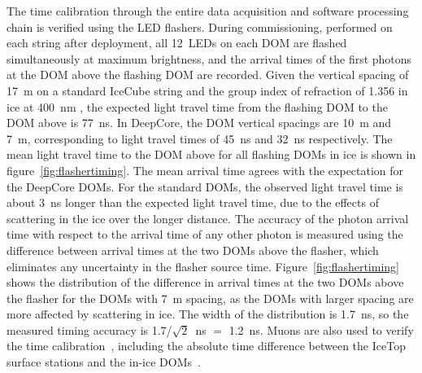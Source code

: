 The time calibration through the entire data acquisition and software
processing chain is verified using the LED flashers. During
commissioning, performed on each string after deployment, all 12~LEDs on
each DOM are flashed simultaneously at 
maximum brightness, and the arrival times of the first photons at the DOM above the flashing DOM
are recorded. Given the vertical spacing of 17~m on a standard IceCube
string and the group index of
refraction of  1.356 in ice at 400~nm \cite{price_woschnagg_ice}, the expected light travel time
from the flashing DOM to the DOM above is 77~ns. In DeepCore, the DOM
vertical spacings are 10~m and 7~m, corresponding to light travel
times of 45~ns and 32~ns respectively. The mean light travel
time to the DOM above for all flashing DOMs in ice is shown in
figure~\ref{fig:flashertiming}. The mean arrival time agrees with the
expectation for the DeepCore DOMs. For the standard DOMs, the observed
light travel time is about 3~ns longer than the expected light travel
time, due to the effects of scattering in the ice over the longer
distance. The accuracy of the photon arrival time with respect to the
arrival time of any other photon is measured using
the difference between arrival times at the two DOMs above the
flasher, which eliminates any uncertainty in the flasher source
time. Figure~\ref{fig:flashertiming} shows the distribution of the
difference in arrival times at the two DOMs above the flasher for the
DOMs with 7~m spacing, as the DOMs with larger spacing are more
affected by scattering in ice. The width of the distribution is
1.7~ns, so the measured timing accuracy is 1.7/$\sqrt{2}$~ns $=$ 1.2~ns. Muons are also used to
verify the time calibration~\cite{ICECUBE:DAQ}, including the absolute time difference
between the IceTop surface stations and the in-ice DOMs~\cite{IC3:perf}.

